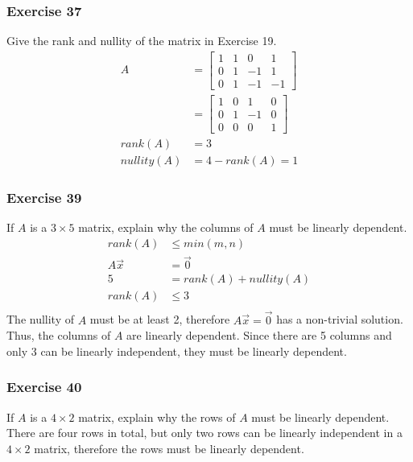 \documentclass{math}
\begin{document}
\subsubsection*{Exercise 37}
Give the rank and nullity of the matrix in Exercise 19.
\begin{align*}
  A &= \begin{bmatrix}
    1 & 1 & 0 & 1 \\
    0 & 1 & -1 & 1 \\
    0 & 1 & -1 & -1
  \end{bmatrix} \\
  &= \begin{bmatrix}
    1 & 0 & 1 & 0 \\
    0 & 1 & -1 & 0 \\
    0 & 0 & 0 & 1
  \end{bmatrix} \\
  rank(A) &= 3 \\
  nullity(A) &= 4-rank(A) = 1
\end{align*}

\subsubsection*{Exercise 39}
If \( A \) is a \( 3\times5 \) matrix, explain why the columns of \( A \) must
be linearly dependent.
\begin{align*}
  rank(A) &\le min(m,n) \\
  A\vec{x} &= \vec{0} \\
  5 &= rank(A)+nullity(A) \\
  rank(A) &\le 3 \\
\end{align*}
The nullity of \( A \) must be at least 2, therefore \( A\vec{x} = \vec{0} \)
has a non-trivial solution. Thus, the columns of \( A \) are linearly
dependent. Since there are 5 columns and only 3 can be linearly independent,
they must be linearly dependent.

\subsubsection*{Exercise 40}
If \( A \) is a \( 4\times2 \) matrix, explain why the rows of \( A \) must
be linearly dependent. \\
There are four rows in total, but only two rows can be linearly independent in
a \( 4\times2 \) matrix, therefore the rows must be linearly dependent.
\end{document}

